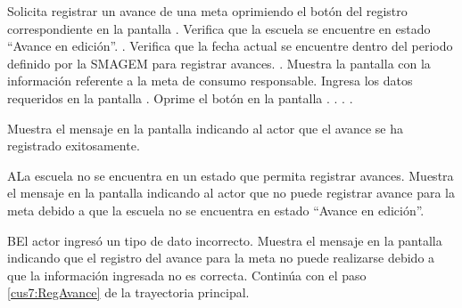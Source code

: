  \begin{UCtrayectoria}
    \UCpaso[\UCactor] Solicita registrar un avance de una meta oprimiendo el botón \botMetas del registro correspondiente en la pantalla .
    \UCpaso[\UCsist] Verifica que la escuela se encuentre en estado ``Avance en edición''. .
    \UCpaso[\UCsist] Verifica que la fecha actual se encuentre dentro del periodo definido por la SMAGEM para registrar avances. .
    \UCpaso[\UCsist] Muestra la pantalla  con la información referente a la meta de consumo responsable. 
    \UCpaso[\UCactor] Ingresa los datos requeridos en la pantalla . \label{cus7:RegAvance}
    \UCpaso[\UCactor] Oprime el botón  en la pantalla . . . .


    \UCpaso[\UCsist] Muestra el mensaje  en la pantalla  indicando al actor que el avance se ha registrado exitosamente.
 \end{UCtrayectoria}
 
    \begin{UCtrayectoriaA}{A}{La escuela no se encuentra en un estado que permita registrar avances.}
    \UCpaso[\UCsist] Muestra el mensaje  en la pantalla  indicando al actor que no puede registrar avance para la meta debido a que la escuela no se encuentra en estado ``Avance en edición''. 
    \end{UCtrayectoriaA}
 
    \begin{UCtrayectoriaA}{B}{El actor ingresó un tipo de dato incorrecto.}    
    \UCpaso[\UCsist] Muestra el mensaje  en la pantalla  indicando que el registro del avance para la meta no puede realizarse debido a que la información ingresada no es correcta.
    \UCpaso[] Continúa con el paso \ref{cus7:RegAvance} de la trayectoria principal.     
    \end{UCtrayectoriaA}
    
